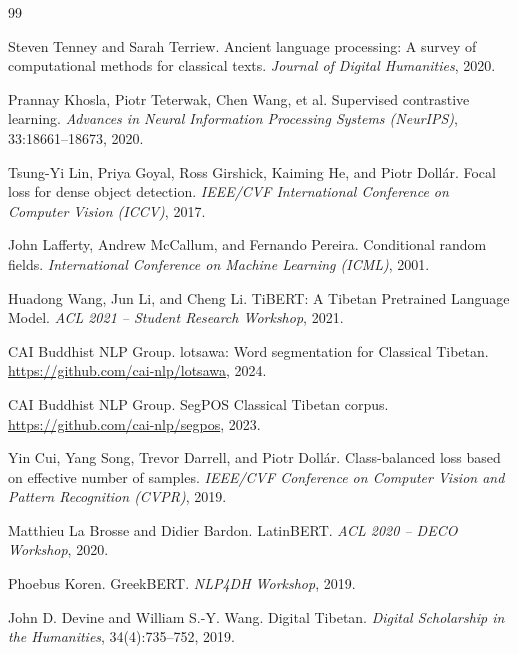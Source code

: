 \documentclass[11pt,a4paper]{article}
\begin{document}
\clearpage
\begin{thebibliography}{99}

Steven Tenney and Sarah Terriew. Ancient language processing: A survey of computational methods for classical texts. \emph{Journal of Digital Humanities}, 2020.

Prannay Khosla, Piotr Teterwak, Chen Wang, et al. Supervised contrastive learning. \emph{Advances in Neural Information Processing Systems (NeurIPS)}, 33:18661--18673, 2020.

Tsung-Yi Lin, Priya Goyal, Ross Girshick, Kaiming He, and Piotr Doll\'ar. Focal loss for dense object detection. \emph{IEEE/CVF International Conference on Computer Vision (ICCV)}, 2017.

John Lafferty, Andrew McCallum, and Fernando Pereira. Conditional random fields. \emph{International Conference on Machine Learning (ICML)}, 2001.

Huadong Wang, Jun Li, and Cheng Li. TiBERT: A Tibetan Pretrained Language Model. \emph{ACL 2021 -- Student Research Workshop}, 2021.

CAI Buddhist NLP Group. lotsawa: Word segmentation for Classical Tibetan. \url{https://github.com/cai-nlp/lotsawa}, 2024.

CAI Buddhist NLP Group. SegPOS Classical Tibetan corpus. \url{https://github.com/cai-nlp/segpos}, 2023.

Yin Cui, Yang Song, Trevor Darrell, and Piotr Doll\'ar. Class-balanced loss based on effective number of samples. \emph{IEEE/CVF Conference on Computer Vision and Pattern Recognition (CVPR)}, 2019.

Matthieu La Brosse and Didier Bardon. LatinBERT. \emph{ACL 2020 -- DECO Workshop}, 2020.

Phoebus Koren. GreekBERT. \emph{NLP4DH Workshop}, 2019.

John D. Devine and William S.-Y. Wang. Digital Tibetan. \emph{Digital Scholarship in the Humanities}, 34(4):735--752, 2019.

\end{thebibliography}
\end{document}
